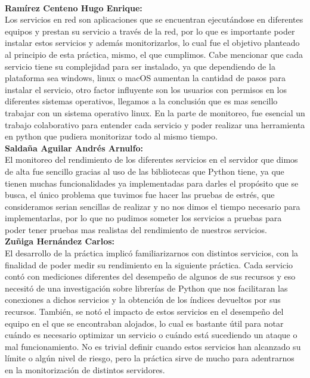 \\
\textbf{Ramírez Centeno Hugo Enrique:}\\
\noindent
Los servicios en red son aplicaciones que se encuentran ejecutándose en diferentes equipos y prestan su servicio a través de la red, por lo que es importante poder instalar estos servicios y además monitorizarlos, lo cual fue el objetivo planteado al principio de esta práctica, mismo, el que cumplimos. Cabe mencionar que cada servicio tiene su complejidad para ser instalado, ya que dependiendo de la plataforma sea windows, linux o macOS aumentan la cantidad de pasos para instalar el servicio, otro factor influyente son los usuarios con permisos en los diferentes sistemas operativos, llegamos a la conclusión que es mas sencillo trabajar con un sistema operativo linux.
En la parte de monitoreo, fue esencial un trabajo colaborativo para entender cada servicio y poder realizar una herramienta en python que pudiera monitorizar todo al mismo tiempo.
\\
\textbf{Saldaña Aguilar Andrés Arnulfo:}\\
El monitoreo del rendimiento de los diferentes servicios en el servidor que dimos de alta fue sencillo gracias al uso de las bibliotecas que Python tiene, ya que tienen muchas funcionalidades ya implementadas para darles el propósito que se busca, el único problema que tuvimos fue hacer las pruebas de estrés, que consideramos serian sencillas de realizar y no nos dimos el tiempo necesario para implementarlas, por lo que no pudimos someter los servicios a pruebas para poder tener pruebas mas realistas del rendimiento de nuestros servicios.
\noindent
\\
\textbf{Zuñiga Hernández Carlos:}\\
El desarrollo de la práctica implicó familiarizarnos con distintos servicios, con la finalidad de poder medir su rendimiento en la siguiente práctica. Cada servicio contó con mediciones diferentes del desempeño de algunos de sus recursos y eso necesitó de una investigación sobre librerías de Python que nos facilitaran las conexiones a dichos servicios y la obtención de los índices devueltos por sus recursos. También, se notó el impacto de estos servicios en el desempeño del equipo en el que se encontraban alojados, lo cual es bastante útil para notar cuándo es necesario optimizar un servicio o cuándo está sucediendo un ataque o mal funcionamiento. No es trivial definir cuando estos servicios han alcanzado su límite o algún nivel de riesgo, pero la práctica sirve de mucho para adentrarnos en la monitorización de distintos servidores.
%